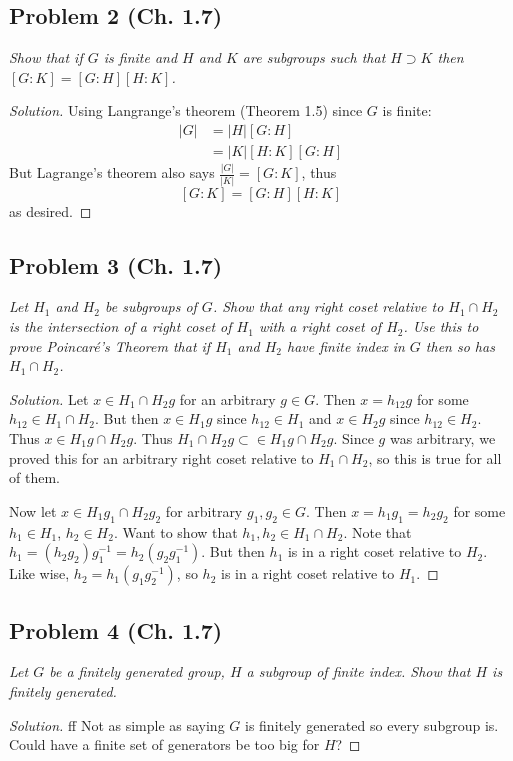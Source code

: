 \documentclass{article}
\begin{document}
\subsection*{Problem 2 (Ch. 1.7)}
{\it Show that if $G$ is finite and $H$ and $K$ are subgroups
such that $H \supset K$
then $[G:K] = [G:H] [H:K]$.}
\begin{proof}[Solution]\let\qed\relax
	Using Langrange's theorem (Theorem 1.5) since $G$ is finite:
	\begin{align*}
		|G|
		&= |H|[G:H]\\
		&= |K|[H:K][G:H]
	\end{align*}
	But Lagrange's theorem also says $\frac{|G|}{|K|} = [G:K]$,
	thus
	\[
		[G:K] = [G:H][H:K]
	\]
	as desired.
\end{proof}

\subsection*{Problem 3 (Ch. 1.7)}
{\it Let $H_1$ and $H_2$ be subgroups of $G$.
Show that any right coset relative to $H_1 \cap H_2$
is the intersection of a right coset of $H_1$ with a right coset of $H_2$.
Use this to prove \emph{Poincar\'{e}'s Theorem}
that if $H_1$ and $H_2$ have finite index in $G$ then so has $H_1 \cap H_2$.}
\begin{proof}[Solution]\let\qed\relax
	Let $x \in H_1\cap H_2g$ for an arbitrary $g \in G$.
	Then $x = h_{12}g$ for some $h_{12} \in H_1 \cap H_2$.
	But then $x \in H_1g$ since $h_{12} \in H_1$
	and $x \in H_2g$ since $h_{12} \in H_2$.
	Thus $x \in H_1g \cap H_2g$.
	Thus $H_1\cap H_2g \subset \in H_1g \cap H_2g$.
	Since $g$ was arbitrary, we proved this for an arbitrary right coset
	relative to $H_1 \cap H_2$, so this is true for all of them.

	Now let $x \in H_1g_1 \cap H_2g_2$ for arbitrary $g_1,g_2\in G$.
	Then $x = h_1g_1 = h_2g_2$ for some $h_1 \in H_1$, $h_2 \in H_2$.
	Want to show that $h_1,h_2 \in H_1 \cap H_2$.
	Note that $h_1 = (h_2g_2)g_1^{-1} = h_2(g_2g_1^{-1})$.
	But then $h_1$ is in a right coset relative to $H_2$.
	Like wise, $h_2 = h_1(g_1g_2^{-1})$, so $h_2$ is in a right coset relative to $H_1$.
\end{proof}

\subsection*{Problem 4 (Ch. 1.7)}
{\it Let $G$ be a finitely generated group,
$H$ a subgroup of finite index.
Show that $H$ is finitely generated.}
\begin{proof}[Solution]\let\qed\relax
	ff
	Not as simple as saying $G$ is finitely generated so every subgroup is.
	Could have a finite set of generators be too big for $H$?
\end{proof}
\end{document}
